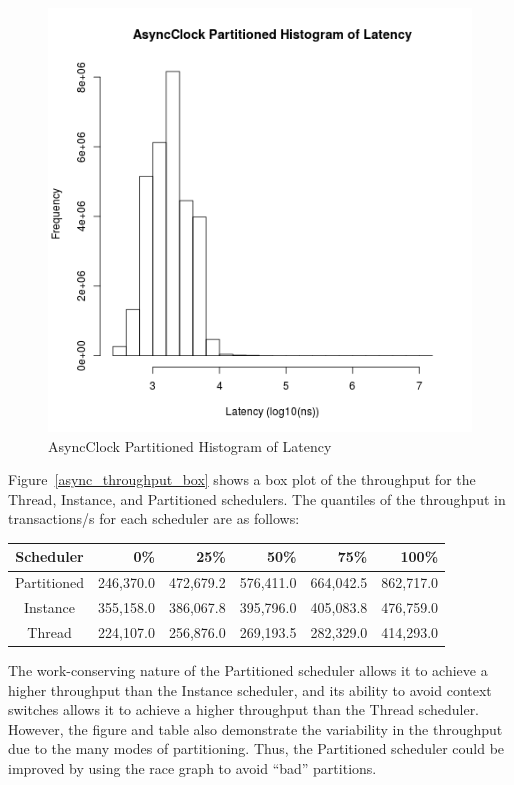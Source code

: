 \begin{figure}
\center
\includegraphics[height=.4\textheight]{async_partitioned_latency_hist.png}
\caption{AsyncClock Partitioned Histogram of Latency}
\label{async_partitioned_latency}
\end{figure}

Figure~\ref{async_throughput_box} shows a box plot of the throughput for the Thread, Instance, and Partitioned schedulers.
The quantiles of the throughput in transactions/s for each scheduler are as follows:
\begin{center}
\begin{tabular}{crrrrr}
Scheduler   &       0\%   &    25\%     &    50\%     &    75\%     &   100\% \\
\hline
Partitioned &   246,370.0 &   472,679.2 &   576,411.0 &   664,042.5 &    862,717.0 \\
Instance    &   355,158.0 &   386,067.8 &   395,796.0 &   405,083.8 &    476,759.0 \\
Thread      &   224,107.0 &   256,876.0 &   269,193.5 &   282,329.0 &    414,293.0 \\
\end{tabular}
\end{center}
The work-conserving nature of the Partitioned scheduler allows it to achieve a higher throughput than the Instance scheduler, and its ability to avoid context switches allows it to achieve a higher throughput than the Thread scheduler.
However, the figure and table also demonstrate the variability in the throughput due to the many modes of partitioning.
Thus, the Partitioned scheduler could be improved by using the race graph to avoid ``bad'' partitions.

